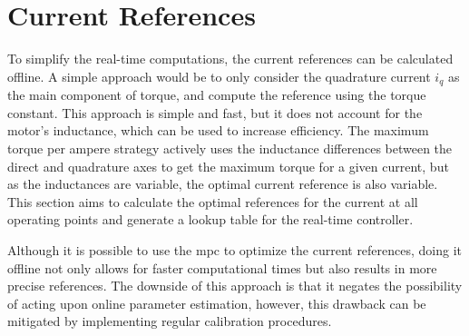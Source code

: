 \section{Current References}
\label{section:Current_references}
\vfill

To simplify the real-time computations, the current references can be calculated offline. A simple approach would be to only consider the quadrature current $i_q$ as the main component of torque, and compute the reference using the torque constant. This approach is simple and fast, but it does not account for the motor's inductance, which can be used to increase efficiency. The maximum torque per ampere strategy actively uses the inductance differences between the direct and quadrature axes to get the maximum torque for a given current, but as the inductances are variable, the optimal current reference is also variable. This section aims to calculate the optimal references for the current at all operating points and generate a lookup table for the real-time controller.

Although it is possible to use the \gls{mpc} to optimize the current references, doing it offline not only allows for faster computational times but also results in more precise references. The downside of this approach is that it negates the possibility of acting upon online parameter estimation, however, this drawback can be mitigated by implementing regular calibration procedures.

